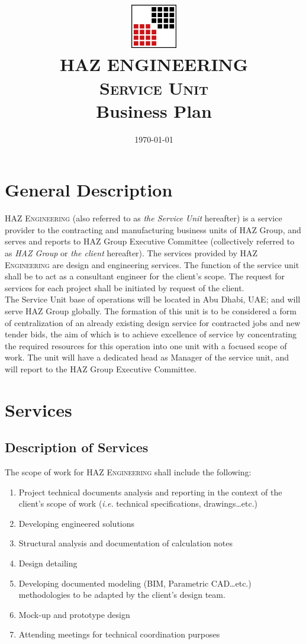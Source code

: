 \documentclass[a4paper,oneside,12pt,final]{article}
\title{\textsc{\includegraphics[width=2cm]{./HAZ}\\\vspace{0.2cm}HAZ ENGINEERING\\Service Unit}\\\vspace{0.5cm}
\Large \textbf{Business Plan}}
\date{\today}
\author{}
\begin{document}
\maketitle
\normalsize

\newpage
\tableofcontents

\newpage

\section{General Description}

\textsc{HAZ Engineering} (also referred to as \emph{the Service Unit} hereafter) is a service provider to the contracting and manufacturing business units of HAZ Group, and serves and reports to HAZ Group Executive Committee (collectively referred to as \emph{HAZ Group} or \emph{the client} hereafter). The services provided by \textsc{HAZ Engineering} are design and engineering services. The function of the service unit shall be to act as a consultant engineer for the client's scope. The request for services for each project shall be initiated by request of the client. \\

The Service Unit base of operations will be located in Abu Dhabi, UAE; and will serve HAZ Group globally. The formation of this unit is to be considered a form of centralization of an already existing design service for contracted jobs and new tender bids, the aim of which is to achieve excellence of service by concentrating the required resources for this operation into one unit with a focused scope of work. The unit will have a dedicated head as Manager of the service unit, and will report to the HAZ Group Executive Committee.\\

\section{Services}

\subsection{Description of Services}

The scope of work for \textsc{HAZ Engineering} shall include the following:
\begin{enumerate}
	\item Project technical documents analysis and reporting in the context of the client's scope of work (\emph{i.e.} technical specifications, drawings\ldots{}etc.)
	\item Developing engineered solutions
	\item Structural analysis and documentation of calculation notes
	\item Design detailing
	\item Developing documented modeling (BIM, Parametric CAD\ldots{}etc.) methodologies to be adapted by the client's design team.
	\item Mock-up and prototype design
	\item Attending meetings for technical coordination purposes
\end{enumerate}
\end{document}
